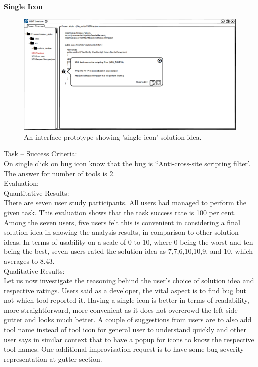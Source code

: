 \textbf{Single Icon}
\begin{figure}[hbt!]
	\centering
	\includegraphics[width=\linewidth]{figures/solution_ideas_snaps/S21_single_icon}
	\caption{An interface prototype showing 'single icon' solution idea.}
	\label{fig:S21_single_icon}
\end{figure}

Task – Success Criteria: \\

On single click on bug icon know that the bug is “Anti-cross-site scripting filter’. The answer for number of tools is 2. \\

Evaluation: \\

Quantitative Results: \\

There are seven user study participants. All users had managed to perform the given task. This evaluation shows that the task success rate is 100 per cent. \\

Among the seven users, five users felt this is convenient in considering a final solution idea in showing the analysis results, in comparison to other solution ideas. In terms of usability on a scale of 0 to 10, where 0 being the worst and ten being the best, seven users rated the solution idea as 7,7,6,10,10,9, and 10, which averages to 8.43. \\
\clearpage
Qualitative Results: \\

Let us now investigate the reasoning behind the user’s choice of solution idea and respective ratings. Users said as a developer, the vital aspect is to find bug but not which tool reported it. Having a single icon is better in terms of readability, more straightforward, more convenient as it does not overcrowd the left-side gutter and looks much better. A couple of suggestions from users are to also add tool name instead of tool icon for general user to understand quickly and other user says in similar context that to have a popup for icons to know the respective tool names. One additional improvisation request is to have some bug severity representation at gutter section. \\

